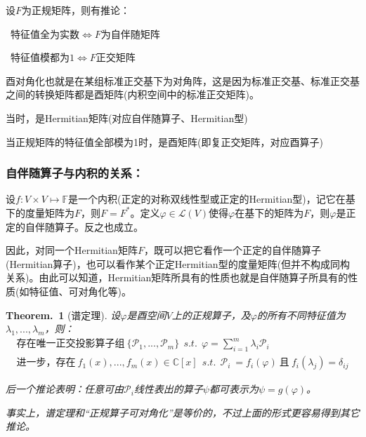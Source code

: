 \documentclass[zihao=5,UTF8]{report}
\theoremstyle{mystyle} %
\newtheorem{theorem}{Theorem.\,}
\begin{document}
设$F$为正规矩阵，则有推论：
\par{}\ 特征值全为实数$\Longleftrightarrow F$为自伴随矩阵   \par
{}\  特征值模都为$1 \Longleftrightarrow F$正交矩阵   \par


{\par\color{gray}\small
酉对角化也就是在某组标准正交基下为对角阵，这是因为标准正交基、标准正交基之间的转换矩阵都是酉矩阵(内积空间中的标准正交矩阵)。\par
当时，是Hermitian矩阵(对应自伴随算子、Hermitian型)\par
当正规矩阵的特征值全部模为1时，是酉矩阵(即复正交矩阵，对应酉算子)
\par}

\subsubsection{自伴随算子与内积的关系：}
设$f: V\times V \longmapsto \mathbb{F}$是一个内积(正定的对称双线性型或正定的Hermitian型)，记它在基下的度量矩阵为$F$，则$F = F^*$。定义$\varphi \in \mathscr{L}(V)$使得$\varphi$在基下的矩阵为$F$，则$\varphi$是正定的自伴随算子。反之也成立。

因此，对同一个Hermitian矩阵$F$，既可以把它看作一个正定的自伴随算子(Hermitian算子)，也可以看作某个正定Hermitian型的度量矩阵(但并不构成同构关系)。由此可以知道，Hermitian矩阵所具有的性质也就是自伴随算子所具有的性质(如特征值、可对角化等)。


\begin{theorem}[谱定理]\label{谱定理}
设$\varphi$是酉空间$V$上的正规算子，及$\varphi$的所有不同特征值为$\lambda_1,...,\lambda_m$，则：
\begin{gather*}
    \text{存在唯一正交投影算子组}\  \{\mathscr{P}_1,...,\mathscr{P}_m\}\ \ s.t. \ \ \varphi = \sum_{i=1}^{m}\lambda_i\mathscr{P}_i\\
    \text{进一步，存在}\ f_1(x),...,f_m(x) \in \mathbb{C}[x]\ \ s.t.\ \ \mathscr{P}_i\ = f_i(\varphi)\ \text{且}\ f_i(\lambda_j) = \delta_{ij}
\end{gather*}
{\par\color{gray}\small
后一个推论表明：任意可由$\mathscr{P}_i$线性表出的算子$\psi$都可表示为$\psi = g(\varphi)$。\par
事实上，谱定理和“正规算子可对角化”是等价的，不过上面的形式更容易得到其它推论。
\par}

\end{theorem}
\end{document}
